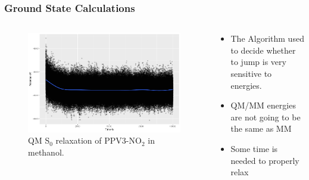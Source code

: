 \documentclass{beamer}
\begin{document}
\begin{frame}
  \frametitle{Ground State Calculations}
\begin{columns}[c]
\begin{figure}
  \includegraphics[width=\textwidth]{Images/qmgroundrelaxation}
  \caption{QM S$_0$ relaxation of PPV3-NO$_2$ in methanol.}
\end{figure}
 
  \begin{block}{}
    \begin{itemize}
      \item The Algorithm used to decide whether to jump is very sensitive to energies.
      \item QM/MM energies are not going to be the same as MM
      \item Some time is needed to properly relax
    \end{itemize}
  \end{block}
\end{columns}
\end{frame}
\end{document}
